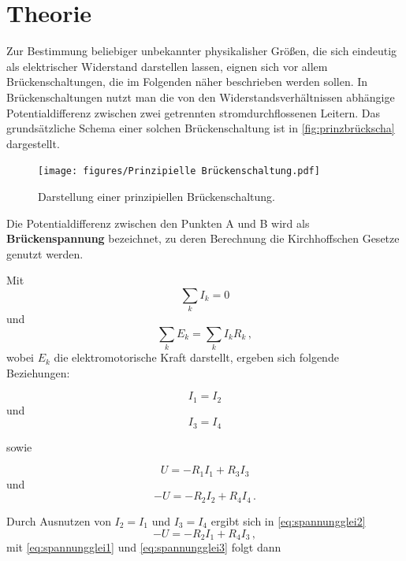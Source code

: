\section{Theorie}
\label{sec:Theorie}

Zur Bestimmung beliebiger unbekannter physikalisher Größen, die sich eindeutig als elektrischer Widerstand darstellen lassen, eignen sich vor allem Brückenschaltungen, die im Folgenden näher beschrieben werden sollen. 
In Brückenschaltungen nutzt man die von den Widerstandsverhältnissen abhängige Potentialdifferenz zwischen zwei getrennten stromdurchflossenen Leitern. Das grundsätzliche Schema einer solchen Brückenschaltung ist in \autoref{fig:prinzbrückscha} dargestellt.

\begin{figure}[H]
    \centering
    \texttt{[image: figures/Prinzipielle Brückenschaltung.pdf]}
    \caption{Darstellung einer prinzipiellen Brückenschaltung\cite{ap07}.}
    \label{fig:prinzbrückscha}
\end{figure}

Die Potentialdifferenz zwischen den Punkten A und B wird als \textbf{Brückenspannung} bezeichnet, zu deren Berechnung die Kirchhoffschen Gesetze genutzt werden.

Mit 
\begin{equation*}
    \sum_kI_k = 0
    \label{eq:kirchhoff1}
\end{equation*}
und 
\begin{equation*}
    \sum_k E_k = \sum_k I_k R_k \,,
    \label{eq:kirchhoff2}
\end{equation*} wobei $E_k$ die elektromotorische Kraft darstellt,
ergeben sich folgende Beziehungen:

\begin{equation*}
    I_1 = I_2
\end{equation*}
und
\begin{equation*}
    I_3 = I_4
\end{equation*}

sowie

\begin{equation}
    U = -R_1 I_1 + R_3 I_3
    \label{eq:spannungglei1}
\end{equation}
und
\begin{equation}
    -U = -R_2 I_2 + R_4 I_4 \,.
    \label{eq:spannungglei2}
\end{equation}

Durch Ausnutzen von $I_2 = I_1$ und $I_3 = I_4$ ergibt sich in \eqref{eq:spannungglei2}
\begin{equation}
    -U = -R_2 I_1 + R_4 I_3
    \label{eq:spannungglei3} \,, 
\end{equation}
mit \eqref{eq:spannungglei1} und \eqref{eq:spannungglei3} folgt dann

